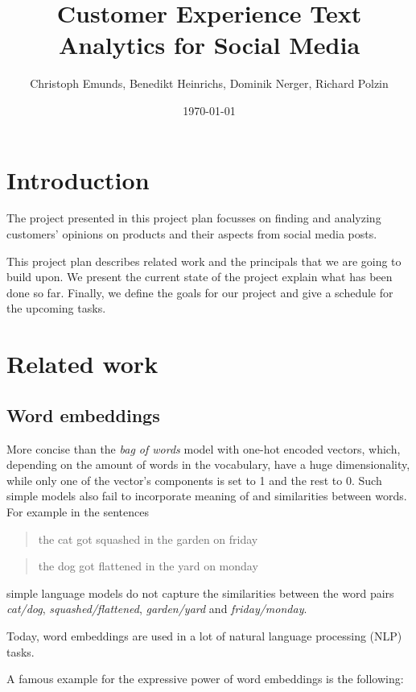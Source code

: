 \documentclass[10pt,a4paper]{article}
\title{{\Huge Customer Experience Text Analytics for Social Media}}
\author{Christoph Emunds, Benedikt Heinrichs, Dominik Nerger, Richard Polzin}
\date{\today}
\begin{document}
	\maketitle
	
	\section{Introduction}
	The project presented in this project plan focusses on finding and analyzing customers' opinions on products and their aspects from social media posts.
	
	This project plan describes related work and the principals that we are going to build upon. We present the current state of the project explain what has been done so far. Finally, we define the goals for our project and give a schedule for the upcoming tasks. 
	
	\section{Related work}
		\subsection{Word embeddings}
		
		More concise than the \textit{bag of words} model with one-hot encoded vectors, which, depending on the amount of words in the vocabulary, have a huge dimensionality, while only one of the vector's components is set to 1 and the rest to 0. Such simple models also fail to incorporate meaning of and similarities between words. For example in the sentences
		\begin{quote}
			the cat got squashed in the garden on friday
		\end{quote}
		\begin{quote}
			the dog got flattened in the yard on monday
		\end{quote}
		simple language models do not capture the similarities between the word pairs \textit{cat/dog}, \textit{squashed/flattened}, \textit{garden/yard} and \textit{friday/monday}.
		
		Today, word embeddings are used in a lot of natural language processing (NLP) tasks.
		
		A famous example for the expressive power of word embeddings is the following:
		
\end{document}
